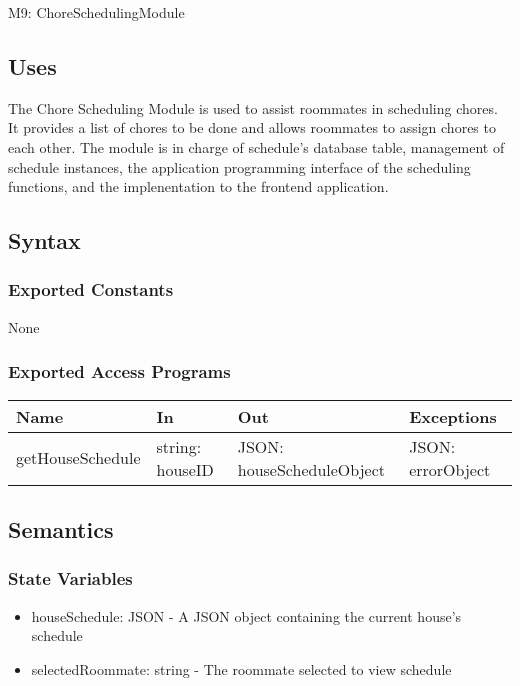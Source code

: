 \documentclass[12pt, titlepage]{article}
\begin{document}
M9: ChoreSchedulingModule

\subsection{Uses}
The Chore Scheduling Module is used to assist roommates in scheduling chores. It provides a list of chores to be done and allows roommates to assign chores to each other. The module is in charge of schedule's database table, management of schedule instances, the application programming interface of the scheduling functions, and the implenentation to the frontend application. 

\subsection{Syntax}

\subsubsection{Exported Constants}
None

\subsubsection{Exported Access Programs}

\begin{center}
\begin{tabular}{p{4cm} p{3cm} p{5cm} p{3.5cm}}
\hline
\textbf{Name} & \textbf{In} & \textbf{Out} & \textbf{Exceptions} \\
\hline
getHouseSchedule & string: houseID & JSON: houseScheduleObject & JSON: errorObject \\
\hline
\end{tabular}
\end{center}

\subsection{Semantics}

\subsubsection{State Variables}

\begin{itemize}
  \item houseSchedule: JSON - A JSON object containing the current house's schedule
  \item selectedRoommate: string - The roommate selected to view schedule
\end{itemize}
\end{document}
